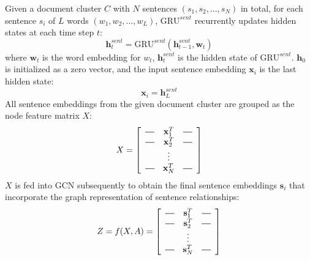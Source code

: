 \documentclass[11pt,a4paper]{article}
\renewcommand{\vec}[1]{\mathbf{#1}}
\begin{document}
Given a document cluster $C$ with $N$ sentences $(s_1, s_2,..., s_N)$ in total, for each sentence $s_i$ of $L$ words $(w_1, w_2,..., w_L)$, $\mathrm{GRU}^{sent}$ recurrently updates hidden states at each time step $t$:
\begin{equation}
\label{eq:gru_sent}
   \vec{h}_{t}^{sent} = \mathrm{GRU}^{sent}(\vec{h}_{t-1}^{sent},\vec{w}_{t})
\end{equation}
where $\vec{w}_t$ is the word embedding for $w_t$, $\vec{h}_t^{sent}$ is the hidden state of $\mathrm{GRU}^{sent}$.
$\vec{h}_0$ is initialized as a zero vector, and the input sentence embedding $\vec{x}_i$ is the last hidden state:
\begin{equation}
  \vec{x}_i = \vec{h}_L^{sent}
\end{equation}
All sentence embeddings from the given document cluster are grouped as the node feature matrix $X$:
\newcommand*{\vertbar}{\rule[-1ex]{0.5pt}{2.5ex}}
\newcommand*{\horzbar}{\rule[.5ex]{2.5ex}{0.5pt}}
\setlength{\extrarowheight}{1ex}
\begin{equation}
  X =
\left[
  \begin{array}{ccc}
    \horzbar & \vec{x}^{T}_{1} & \horzbar \\
    \horzbar & \vec{x}^{T}_{2} & \horzbar \\
             & \vdots    &          \\
    \horzbar & \vec{x}^{T}_{N} & \horzbar
  \end{array}
\right]  
\end{equation}
$X$ is fed into GCN subsequently to obtain the final sentence embeddings $\vec{s}_{i}$ that incorporate the graph representation of sentence relationships:
\begin{equation}
   Z = f(X,A) =
\left[
  \begin{array}{ccc}
    \horzbar & \vec{s}^{T}_{1} & \horzbar \\
    \horzbar & \vec{s}^{T}_{2} & \horzbar \\
             & \vdots    &          \\
    \horzbar & \vec{s}^{T}_{N} & \horzbar
  \end{array}
\right] 
\end{equation}
\end{document}
